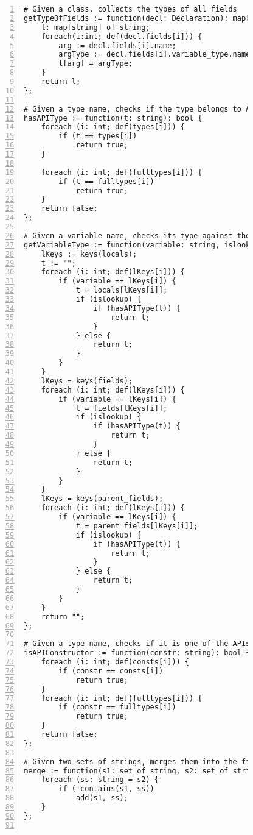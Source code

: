 \begin{figure}[ht!]
\begin{lstlisting}[numbers=left, tabsize=4, escapechar=@, caption={API Usage Mining Analysis},label={lst:aun-code}, lastline = 10]
# Given a class, collects the types of all fields
getTypeOfFields := function(decl: Declaration): map[string] of string {
    l: map[string] of string;
    foreach(i:int; def(decl.fields[i])) {
        arg := decl.fields[i].name;
        argType := decl.fields[i].variable_type.name;
        l[arg] = argType;
    }
    return l;
};

# Given a type name, checks if the type belongs to APIs of interest
hasAPIType := function(t: string): bool {
    foreach (i: int; def(types[i])) {
        if (t == types[i])
            return true;
    }
    
    foreach (i: int; def(fulltypes[i])) {
        if (t == fulltypes[i])
            return true;
    }
    return false;    
};

# Given a variable name, checks its type against the APIs of interest
getVariableType := function(variable: string, islookup: bool): string {
    lKeys := keys(locals);
    t := "";
    foreach (i: int; def(lKeys[i])) {
        if (variable == lKeys[i]) {
            t = locals[lKeys[i]];
            if (islookup) {
                if (hasAPIType(t)) {
                    return t;
                }
            } else {
                return t;
            }
        }
    }
    lKeys = keys(fields);
    foreach (i: int; def(lKeys[i])) {
        if (variable == lKeys[i]) {
            t = fields[lKeys[i]];
            if (islookup) {
                if (hasAPIType(t)) {
                    return t;
                }
            } else {
                return t;
            }
        }
    }
    lKeys = keys(parent_fields);
    foreach (i: int; def(lKeys[i])) {
        if (variable == lKeys[i]) {
            t = parent_fields[lKeys[i]];
            if (islookup) {
                if (hasAPIType(t)) {
                    return t;
                }
            } else {
                return t;
            }
        }
    }
    return "";
}; 

# Given a type name, checks if it is one of the APIs of interest
isAPIConstructor := function(constr: string): bool {
    foreach (i: int; def(consts[i])) {
        if (constr == consts[i])
            return true;
    }
    foreach (i: int; def(fulltypes[i])) {
        if (constr == fulltypes[i])
            return true;
    }
    return false;
};

# Given two sets of strings, merges them into the first set retaining only unique elements
merge := function(s1: set of string, s2: set of string) {
    foreach (ss: string = s2) {
        if (!contains(s1, ss))
            add(s1, ss);
    }
};


\end{lstlisting}
\end{figure}
